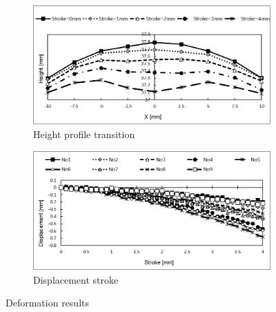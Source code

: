 \begin{figure}
    \centering
    \begin{subfigure}[b]{0.5\textwidth}
    \centering
    \includegraphics[width=\textwidth]{Images/appendix/ynu/fig7hightprofiletransition.png}
    \caption{Height profile transition}
    \label{fig:heighttrans}
    \end{subfigure}
    \hfill
    \begin{subfigure}[b]{0.5\textwidth}
    \centering
    \includegraphics[width=\textwidth]{Images/appendix/ynu/fig8displacementsstroke.png}
    \caption{Displacement stroke}
    \label{fig:disstroke}
    \end{subfigure}
    \vspace{0.5cm}
    \caption{Deformation results}
    \label{fig:defmeasurementynu}
\end{figure}